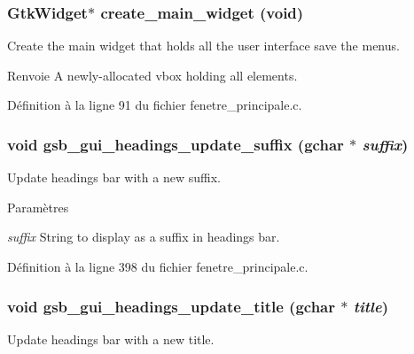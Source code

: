 \subsubsection[{create\_\-main\_\-widget}]{\setlength{\rightskip}{0pt plus 5cm}GtkWidget$\ast$ create\_\-main\_\-widget (void)}\label{fenetre__principale_8c_af3f1b8f11e630ea3467cca17ef4ee048}
Create the main widget that holds all the user interface save the menus.

\begin{DoxyReturn}{Renvoie}
A newly-\/allocated vbox holding all elements. 
\end{DoxyReturn}


Définition à la ligne 91 du fichier fenetre\_\-principale.c.

\subsubsection[{gsb\_\-gui\_\-headings\_\-update\_\-suffix}]{\setlength{\rightskip}{0pt plus 5cm}void gsb\_\-gui\_\-headings\_\-update\_\-suffix (gchar $\ast$ {\em suffix})}\label{fenetre__principale_8c_aeed9c0940d61e6cf37c5f421ce3b663f}
Update headings bar with a new suffix.


\begin{DoxyParams}{Paramètres}
\item[{\em suffix}]String to display as a suffix in headings bar. \end{DoxyParams}


Définition à la ligne 398 du fichier fenetre\_\-principale.c.

\subsubsection[{gsb\_\-gui\_\-headings\_\-update\_\-title}]{\setlength{\rightskip}{0pt plus 5cm}void gsb\_\-gui\_\-headings\_\-update\_\-title (gchar $\ast$ {\em title})}\label{fenetre__principale_8c_a7dd6f116baa9323630e845e36615fc53}
Update headings bar with a new title.


